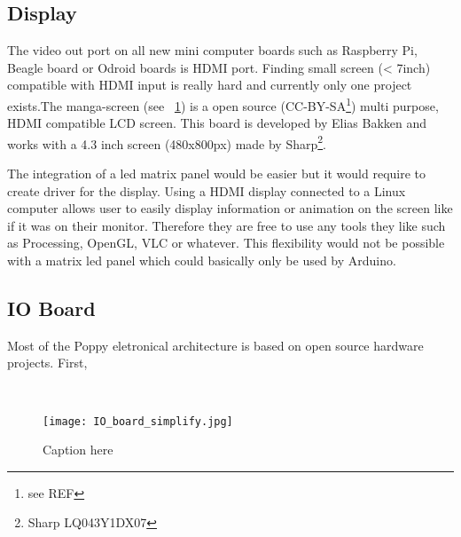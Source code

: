 \subsection{Display} %

The video out port on all new mini computer boards such as Raspberry Pi, Beagle board or Odroid boards is HDMI port. Finding small screen (< 7inch) compatible with HDMI input is really hard and currently only one project exists.The manga-screen (see \figurename~\ref{fig:manga-screen}) is a open source (CC-BY-SA\footnote{see REF}) multi purpose, HDMI compatible LCD screen. This board is developed by Elias Bakken and works with a 4.3 inch screen (480x800px) made by Sharp\footnote{Sharp LQ043Y1DX07}.

\begin{figure}[h]
\centering
    \hfil
    \caption{}
    \label{fig:manga-screen}
\end{figure}

The integration of a led matrix panel would be easier but it would require to create driver for the display.
Using a HDMI display connected to a Linux computer allows user to easily display information or animation on the screen like if it was on their monitor. Therefore they are free to use any tools they like such as Processing, OpenGL, VLC or whatever. This flexibility would not be possible with a matrix led panel which could basically only be used by Arduino.


\subsection{IO Board} %

Most of the Poppy eletronical architecture is based on open source hardware projects. First,
\begin{figure}[]
\centering
    \\
    \caption{}
    \label{fig:}
\end{figure}

\begin{figure}[tb]
    \begin{center}
        \texttt{[image: IO\_board\_simplify.jpg]}
    \end{center}
    \caption{Caption here}
    \label{fig:figure1}
\end{figure}




